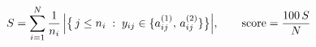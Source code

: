 \documentclass[border=2pt]{standalone}
\begin{document}
$\displaystyle S=\sum_{i=1}^{N}\frac{1}{n_i}\,\Bigl|\bigl\{\,j\le n_i\;:\;y_{ij}\in\{a^{(1)}_{ij},\,a^{(2)}_{ij}\}\bigr\}\Bigr|,\qquad \mathrm{score}=\frac{100\,S}{N}$
\end{document}
